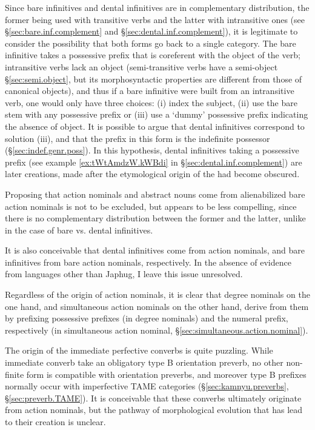 Since bare infinitives and dental infinitives are in complementary distribution, the former being used with transitive verbs and the latter with intransitive ones (see §\ref{sec:bare.inf.complement} and §\ref{sec:dental.inf.complement}), it is legitimate to consider the possibility that both forms go back to a single category.  The bare infinitive takes a possessive prefix that is coreferent with the object of the verb; intransitive verbs lack an object (semi-transitive verbs have a semi-object §\ref{sec:semi.object}, but its morphosyntactic properties are different from those of canonical objects), and thus if a bare infinitive were built from an intransitive verb, one would only have three choices: (i) index the subject, (ii) use the bare stem with any possessive prefix or (iii) use a `dummy' possessive prefix indicating the absence of object. It is possible to argue that dental infinitives correspond to solution (iii), and that the  prefix in this form is the indefinite possessor  (§\ref{sec:indef.genr.poss}). In this hypothesis, dental infinitives taking a possessive prefix (see example \ref{ex:tWtAmdzW.kWBdi} in §\ref{sec:dental.inf.complement}) are later creations, made after the etymological origin of the  had become obscured.

Proposing that  action nominals and  abstract nouns come from alienabilized bare action nominals is not to be excluded, but appears to be less compelling, since there is no complementary distribution between the former and the latter, unlike in the case of bare vs. dental infinitives.

It is also conceivable that dental infinitives come from  action nominals, and bare infinitives from bare action nominals, respectively. In the absence of evidence from languages other than Japhug, I leave this issue unresolved.

Regardless of the origin of action nominals, it is clear that degree nominals on the one hand, and simultaneous action nominals on the other hand, derive from them by prefixing possessive prefixes (in degree nominals) and the numeral  prefix, respectively (in simultaneous action nominal, §\ref{sec:simultaneous.action.nominal}).

The origin of the immediate perfective converbs is quite puzzling. While immediate converb take an obligatory type B orientation preverb, no other  non-finite form is compatible with orientation preverbs, and moreover type B prefixes normally occur with imperfective TAME categories (§\ref{sec:kamnyu.preverbs}, §\ref{sec:preverb.TAME}). It is conceivable that these converbs ultimately originate from action nominals, but the pathway of morphological evolution that has lead to their creation is unclear.


